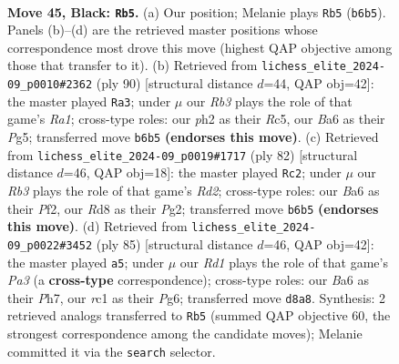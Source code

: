 \documentclass[11pt]{article}
\begin{document}
\clearpage

\begin{figure}[p]\centering
\begin{subfigure}{0.46\textwidth}\centering
\resizebox{\linewidth}{!}{%
\newchessgame
\chessboard[
  setfen={3r2k1/5p1p/br6/p7/3p2P1/1P3B1N/1R5P/2R1K3 b - - 5 45},
  showmover=false,
  pgfstyle=straightmove, color=movearrow, markmove={b6-b5}
]}
\caption{}
\end{subfigure}\hfill
\begin{subfigure}{0.46\textwidth}\centering
\resizebox{\linewidth}{!}{%
\newchessgame
\chessboard[
  setfen={8/r5kp/1r1n2p1/2RP2P1/p7/8/6P1/R5K1 w - - 3 46},
  showmover=false,
  pgfstyle=straightmove, color=movearrow, markmove={a1-a3}
]}
\caption{}
\end{subfigure}
\\[4pt]
\begin{subfigure}{0.46\textwidth}\centering
\resizebox{\linewidth}{!}{%
\newchessgame
\chessboard[
  setfen={r5k1/6p1/7p/8/2p5/r1P4P/p2R1PP1/R4K2 w - - 6 42},
  showmover=false,
  pgfstyle=straightmove, color=movearrow, markmove={d2-c2}
]}
\caption{}
\end{subfigure}\hfill
\begin{subfigure}{0.46\textwidth}\centering
\resizebox{\linewidth}{!}{%
\newchessgame
\chessboard[
  setfen={3r3k/2r4p/p5p1/2PP4/1P1R4/8/3p2K1/3N4 b - - 0 43},
  showmover=false,
  pgfstyle=straightmove, color=movearrow, markmove={a6-a5}
]}
\caption{}
\end{subfigure}
\caption{\textbf{Move 45, Black: \texttt{Rb5}.} (a) Our position; Melanie plays \texttt{Rb5} (\texttt{b6b5}). Panels (b)--(d) are the retrieved master positions whose correspondence most drove this move (highest QAP objective among those that transfer to it). (b) Retrieved from \texttt{lichess\_elite\_2024-09\_p0010\#2362} (ply 90) [structural distance $d$=44, QAP obj=42]: the master played \texttt{Ra3}; under $\mu$ our \emph{Rb3} plays the role of that game's \emph{Ra1}; cross-type roles: our \emph{p}h2 as their \emph{R}c5, our \emph{B}a6 as their \emph{P}g5; transferred move \texttt{b6b5} \textbf{(endorses this move)}. (c) Retrieved from \texttt{lichess\_elite\_2024-09\_p0019\#1717} (ply 82) [structural distance $d$=46, QAP obj=18]: the master played \texttt{Rc2}; under $\mu$ our \emph{Rb3} plays the role of that game's \emph{Rd2}; cross-type roles: our \emph{B}a6 as their \emph{P}f2, our \emph{R}d8 as their \emph{P}g2; transferred move \texttt{b6b5} \textbf{(endorses this move)}. (d) Retrieved from \texttt{lichess\_elite\_2024-09\_p0022\#3452} (ply 85) [structural distance $d$=46, QAP obj=42]: the master played \texttt{a5}; under $\mu$ our \emph{Rd1} plays the role of that game's \emph{Pa3} (a \textbf{cross-type} correspondence); cross-type roles: our \emph{B}a6 as their \emph{P}h7, our \emph{r}c1 as their \emph{P}g6; transferred move \texttt{d8a8}. Synthesis: 2 retrieved analogs transferred to \texttt{Rb5} (summed QAP objective 60, the strongest correspondence among the candidate moves); Melanie committed it via the \texttt{search} selector.}
\label{fig:thought-m89}
\end{figure}
\end{document}
